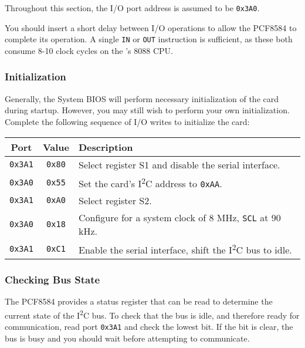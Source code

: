 \documentclass[twoside,10pt,letterpaper]{refart}
\newcommand{\itwoc}{I\textsuperscript{2}C}
\begin{document}
Throughout this section, the I/O port address is assumed to be \texttt{0x3A0}.

You should insert a short delay between I/O operations to allow the PCF8584 to complete its operation. A single
\texttt{IN} or \texttt{OUT} instruction is sufficient, as these both consume 8-10 clock cycles on the 's 8088
CPU.

\subsubsection{Initialization}
Generally, the  System BIOS will perform necessary initialization of the card during startup.
However, you may still wish to perform your own initialization. Complete the following sequence of I/O writes
to initialize the card:

\begin{center}
    \begin{tabular}{ c|c|l }
        \textbf{Port} & \textbf{Value} & \textbf{Description} \\
        \hline
        \texttt{0x3A1} & \texttt{0x80} & Select register S1 and disable the serial interface. \\
        \texttt{0x3A0} & \texttt{0x55} & Set the card's \itwoc{} address to \texttt{0xAA}. \\
        \texttt{0x3A1} & \texttt{0xA0} & Select register S2. \\
        \texttt{0x3A0} & \texttt{0x18} & Configure for a system clock of 8 MHz\footnotemark, \texttt{SCL} at 90 kHz. \\
        \texttt{0x3A1} & \texttt{0xC1} & Enable the serial interface, shift the \itwoc{} bus to idle. \\
    \end{tabular}
\end{center}


\subsubsection{Checking Bus State} \label{i2cbridge:busstate}
The PCF8584 provides a status register that can be read to determine the current state of the \itwoc{} bus.
To check that the bus is idle, and therefore ready for communication, read port \texttt{0x3A1} and check
the lowest bit. If the bit is clear, the bus is busy and you should wait before attempting to communicate.
\end{document}
